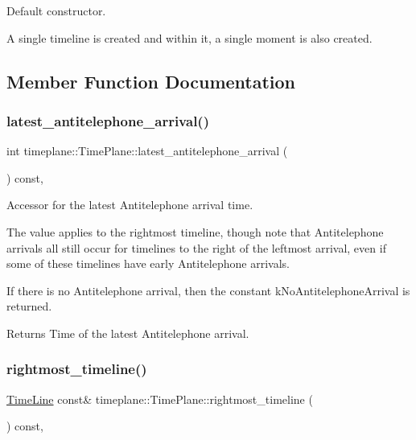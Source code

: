 Default constructor. 

A single timeline is created and within it, a single moment is also created. 

\subsection{Member Function Documentation}
\mbox{\label{classtimeplane_1_1_time_plane_ae66d15a7ce9adb5f63906011a455400b}} 
\subsubsection{\texorpdfstring{latest\+\_\+antitelephone\+\_\+arrival()}{latest\_antitelephone\_arrival()}}
{\footnotesize\ttfamily int timeplane\+::\+Time\+Plane\+::latest\+\_\+antitelephone\+\_\+arrival (\begin{DoxyParamCaption}{ }\end{DoxyParamCaption}) const\hspace{0.3cm}{\ttfamily [inline]}, {\ttfamily [noexcept]}}



Accessor for the latest Antitelephone arrival time. 

The value applies to the rightmost timeline, though note that Antitelephone arrivals all still occur for timelines to the right of the leftmost arrival, even if some of these timelines have early Antitelephone arrivals.

If there is no Antitelephone arrival, then the constant {\ttfamily k\+No\+Antitelephone\+Arrival} is returned. \begin{DoxyReturn}{Returns}
Time of the latest Antitelephone arrival. 
\end{DoxyReturn}
\mbox{\label{classtimeplane_1_1_time_plane_adec17c7b3931df31bd14478f55df5821}} 
\subsubsection{\texorpdfstring{rightmost\+\_\+timeline()}{rightmost\_timeline()}\hspace{0.1cm}{\footnotesize\ttfamily [1/2]}}
{\footnotesize\ttfamily \hyperlink{classtimeplane_1_1_time_line}{Time\+Line} const\& timeplane\+::\+Time\+Plane\+::rightmost\+\_\+timeline (\begin{DoxyParamCaption}{ }\end{DoxyParamCaption}) const\hspace{0.3cm}{\ttfamily [inline]}, {\ttfamily [noexcept]}}



